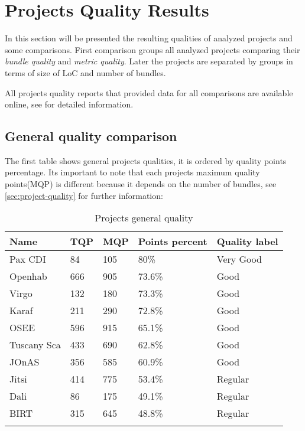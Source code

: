 \section{Projects Quality Results}
In this section will be presented the resulting qualities of analyzed projects and some comparisons. First comparison groups all analyzed  projects comparing their \emph{bundle quality} and \emph{metric quality}. Later the projects are separated by groups in terms of size of LoC and number of bundles.

All projects quality reports that provided data for all comparisons are available online, see \citep{intrabundle reports 2014} for detailed information. 

\subsection{General quality comparison}

The first table shows general projects qualities, it is ordered by quality points percentage. Its important to note that each projects maximum quality points(MQP) is different because it depends on the number of bundles, see \ref{sec:project-quality} for further information:

\begin{table}[h]
\caption{Projects general quality}
\label{projects-general-quality}
    \begin{tabular}{  p{3cm} | p{2cm} | p{2cm} | p{3cm} | p{4cm}}
    \Xhline{2\arrayrulewidth}
    Name & TQP & MQP & Points percent & Quality label \\  \hline
    Pax CDI & 84 & 105 & 80\% & Very Good\\ \hline 
    Openhab & 	666 & 905 & 73.6\% & Good\\ \hline
    Virgo & 132 & 180 & 73.3\% & Good\\ 
    Karaf & 211 & 290 & 72.8\% & Good\\ \hline
    OSEE & 596 & 915 & 65.1\% & Good\\ \hline
    Tuscany Sca & 433 & 690 & 62.8\% & Good\\ \hline
    JOnAS & 356 & 585 & 60.9\%  & Good\\ \hline
    Jitsi & 414 & 775 & 53.4\% & Regular\\ \hline
    Dali & 86 & 175 & 49.1\%  & Regular\\ \hline
    BIRT & 315 & 645 & 48.8\% & Regular\\ \hline
   \Xhline{2\arrayrulewidth}
    \end{tabular}
\end{table}
\FloatBarrier 

